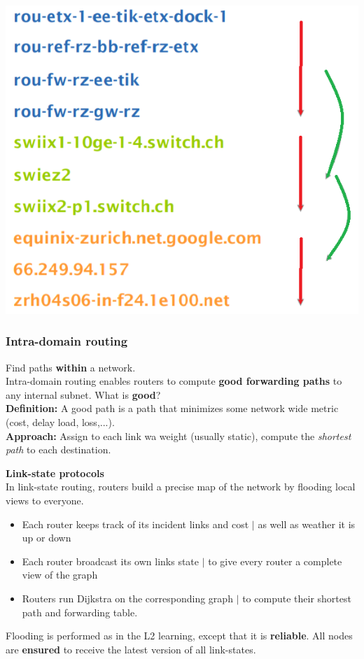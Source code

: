 \documentclass[a4paper, fontsize=8pt, landscape, DIV=1]{scrartcl}
\begin{document}
\begin{multicols*}{4}
\begin{center}
			\includegraphics[width=0.5\columnwidth]{images/Network_Layer/intra_vs_inter_2.png}
		\end{center}
		
		\subsubsection{Intra-domain routing}
		Find paths \textbf{within} a network.\\
		Intra-domain routing enables routers to compute \textbf{good forwarding
			paths} to any internal subnet. What is \textbf{good}?\\
		\textbf{Definition:} A good path is a path that minimizes some network wide
		metric (cost, delay load, loss,...).\\
		\textbf{Approach:} Assign to each link wa weight (usually static), compute
		the \textit{shortest path} to each destination.\par
		
		\textbf{Link-state protocols}\\
		In link-state routing, routers build a precise map of the network by
		flooding local views to everyone. 
		\begin{itemize}[noitemsep]
			\item Each router keeps track of its incident links and cost $\vert$ as
			well as weather it is up or down
			\item Each router broadcast its own links state $\vert$ to give every
			router a complete view of the graph
			\item Routers run Dijkstra on the corresponding graph $\vert$ to compute
			their shortest path and forwarding table. 
		\end{itemize}
		Flooding is performed as in the L2 learning, except that it is
		\textbf{reliable}. All nodes are \textbf{ensured} to receive the latest version
		of all link-states.\\
		\newpage
		

\end{multicols*}
\end{document}
